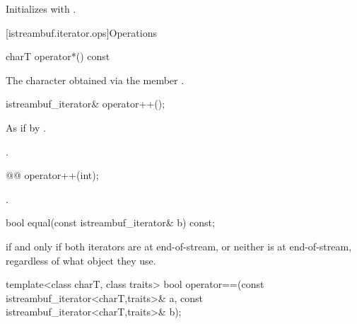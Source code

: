 \begin{itemdescr}
\pnum
\effects
Initializes  with .
\end{itemdescr}

[istreambuf.iterator.ops]{Operations}

%
\begin{itemdecl}
charT operator*() const
\end{itemdecl}

\begin{itemdescr}
\pnum
\returns
The character obtained via the
member
.
\end{itemdescr}

%
\begin{itemdecl}
istreambuf_iterator& operator++();
\end{itemdecl}

\begin{itemdescr}
\pnum
\effects
As if by .

\pnum
\returns
{}.
\end{itemdescr}

%
\begin{itemdecl}
@@ operator++(int);
\end{itemdecl}

\begin{itemdescr}
\pnum
\returns
{}.
\end{itemdescr}

%
\begin{itemdecl}
bool equal(const istreambuf_iterator& b) const;
\end{itemdecl}

\begin{itemdescr}
\pnum
\returns
{}
if and only if both iterators are at end-of-stream,
or neither is at end-of-stream, regardless of what
object they use.
\end{itemdescr}

%
\begin{itemdecl}
template<class charT, class traits>
  bool operator==(const istreambuf_iterator<charT,traits>& a,
                  const istreambuf_iterator<charT,traits>& b);
\end{itemdecl}

